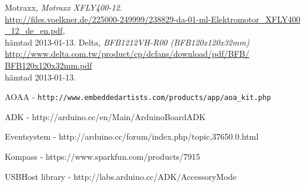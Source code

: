 \begin{thebibliography}{9}
Motraxx,
\emph{Motraxx XFLY400-12}. \\
\url{http://files.voelkner.de/225000-249999/238829-da-01-ml-Elektromotor_XFLY400
_12_de_en.pdf},
\\ hämtad 2013-01-13.
Delta,
\emph{BFB1212VH-R00 (BFB120x120x32mm)} \\
\url{http://www.delta.com.tw/product/cp/dcfans/download/pdf/BFB/
BFB120x120x32mm.pdf}
\\ hämtad 2013-01-13.
\end{thebibliography}

AOAA - \verb|http://www.embeddedartists.com/products/app/aoa_kit.php|

ADK - http://arduino.cc/en/Main/ArduinoBoardADK

Eventsystem - http://arduino.cc/forum/index.php/topic,37650.0.html

Kompass - https://www.sparkfun.com/products/7915

USBHost library - http://labs.arduino.cc/ADK/AccessoryMode 